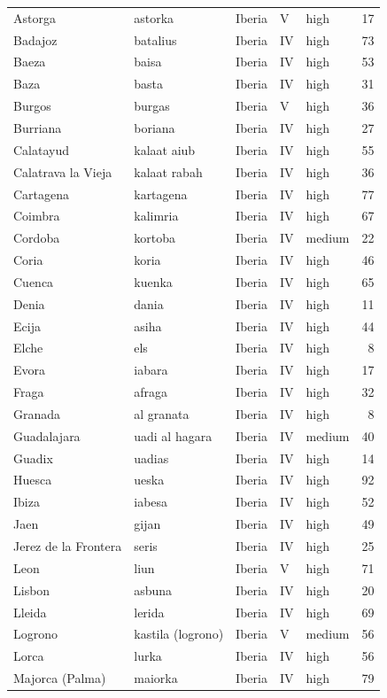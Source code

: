 \documentclass[11pt,a4paper]{article}
\begin{document}
{\begin{longtable}{p{4.6cm}p{3.0cm}p{3.6cm}llr}
Astorga & astorka & Iberia & V & high & 17\\
Badajoz & batalius & Iberia & IV & high & 73\\
Baeza & baisa & Iberia & IV & high & 53\\
Baza & basta & Iberia & IV & high & 31\\
Burgos & burgas & Iberia & V & high & 36\\
Burriana & boriana & Iberia & IV & high & 27\\
Calatayud & kalaat aiub & Iberia & IV & high & 55\\
Calatrava la Vieja & kalaat rabah & Iberia & IV & high & 36\\
Cartagena & kartagena & Iberia & IV & high & 77\\
Coimbra & kalimria & Iberia & IV & high & 67\\
Cordoba & kortoba & Iberia & IV & medium & 22\\
Coria & koria & Iberia & IV & high & 46\\
Cuenca & kuenka & Iberia & IV & high & 65\\
Denia & dania & Iberia & IV & high & 11\\
Ecija & asiha & Iberia & IV & high & 44\\
Elche & els & Iberia & IV & high & 8\\
Evora & iabara & Iberia & IV & high & 17\\
Fraga & afraga & Iberia & IV & high & 32\\
Granada & al granata & Iberia & IV & high & 8\\
Guadalajara & uadi al hagara & Iberia & IV & medium & 40\\
Guadix & uadias & Iberia & IV & high & 14\\
Huesca & ueska & Iberia & IV & high & 92\\
Ibiza & iabesa & Iberia & IV & high & 52\\
Jaen & gijan & Iberia & IV & high & 49\\
Jerez de la Frontera & seris & Iberia & IV & high & 25\\
Leon & liun & Iberia & V & high & 71\\
Lisbon & asbuna & Iberia & IV & high & 20\\
Lleida & lerida & Iberia & IV & high & 69\\
Logrono & kastila (logrono) & Iberia & V & medium & 56\\
Lorca & lurka & Iberia & IV & high & 56\\
Majorca (Palma) & maiorka & Iberia & IV & high & 79\\

\end{longtable}}
\end{document}
